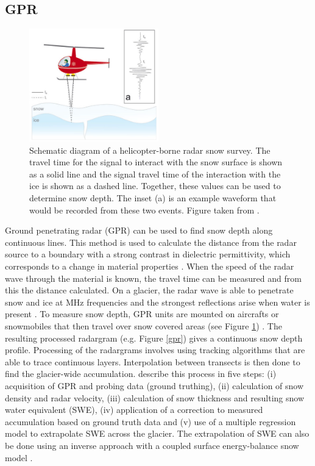 \documentclass{sfuthesis}
\begin{document}
\subsection{GPR}
\label{sec:GPR}
\begin{figure}
 \centering
      \includegraphics[width=0.5\textwidth]{gpr_air.png}
  \caption{Schematic diagram of a helicopter-borne radar snow survey. The travel time for the signal to interact with the snow surface is shown as a solid line and the signal travel time of the interaction with the ice is shown as a dashed line. Together, these values can be used to determine snow depth. The inset (a) is an example waveform that would be recorded from these two events. Figure taken from \cite{Gusmeroli2014}.}
        \label{gprair}
\end{figure}

Ground penetrating radar (GPR) can be used to find snow depth along continuous lines. This method is used to calculate the distance from the radar source to a boundary with a strong contrast in dielectric permittivity, which corresponds to a change in material properties \citep{Sold2013}. When the speed of the radar wave through the material is known, the travel time can be measured and from this the distance calculated. On a glacier, the radar wave is able to penetrate snow and ice at MHz frequencies and the strongest reflections arise when water is present \citep{Sold2013}. To measure snow depth, GPR units are mounted on aircrafts or snowmobiles that then travel over snow covered areas (see Figure \ref{gprair}) \citep{Machguth2006, McGrath2015}. The resulting processed radargram (e.g. Figure \ref{gpr}) gives a continuous snow depth profile. Processing of the radargrams involves using tracking algorithms that are able to trace continuous layers. Interpolation between transects is then done to find the glacier-wide accumulation. \cite{McGrath2015} describe this process in five steps: (i) acquisition of GPR and probing data (ground truthing), (ii) calculation of snow density and radar velocity, (iii) calculation of snow thickness and resulting snow water equivalent (SWE), (iv) application of a correction to measured accumulation based on ground truth data and (v) use of a multiple regression model to extrapolate SWE across the glacier. The extrapolation of SWE can also be done using an inverse approach with a coupled surface energy-balance snow model \citep{Pelt2014}.
\end{document}
